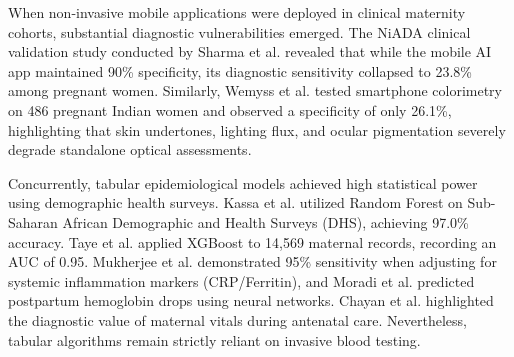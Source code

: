 \documentclass[journal,10pt,twocolumn]{IEEEtran}
\begin{document}
When non-invasive mobile applications were deployed in clinical maternity cohorts, substantial diagnostic vulnerabilities emerged. The NiADA clinical validation study conducted by Sharma et al. \cite{niada2024cureus} revealed that while the mobile AI app maintained 90\% specificity, its diagnostic sensitivity collapsed to 23.8\% among pregnant women. Similarly, Wemyss et al. \cite{wemyss2025smartphone} tested smartphone colorimetry on 486 pregnant Indian women and observed a specificity of only 26.1\%, highlighting that skin undertones, lighting flux, and ocular pigmentation severely degrade standalone optical assessments.

Concurrently, tabular epidemiological models achieved high statistical power using demographic health surveys. Kassa et al. \cite{ethiopian_dhs2024} utilized Random Forest on Sub-Saharan African Demographic and Health Surveys (DHS), achieving 97.0\% accuracy. Taye et al. \cite{taye2026machine} applied XGBoost to 14,569 maternal records, recording an AUC of 0.95. Mukherjee et al. \cite{ijmr2026inflammation} demonstrated 95\% sensitivity when adjusting for systemic inflammation markers (CRP/Ferritin), and Moradi et al. \cite{scirep2024postdelivery} predicted postpartum hemoglobin drops using neural networks. Chayan et al. \cite{maternal_survey2024synthesis} highlighted the diagnostic value of maternal vitals during antenatal care. Nevertheless, tabular algorithms remain strictly reliant on invasive blood testing.
\end{document}
